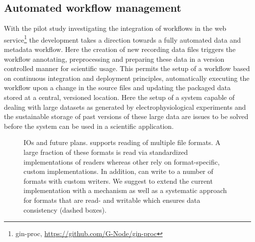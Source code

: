 \subsection{Automated workflow management}
With the pilot study investigating the integration of  workflows in the  web service\footnote{gin-proc, \url{https://github.com/G-Node/gin-proc}} the development takes a direction towards a fully automated data and metadata workflow. Here the creation of new recording data files triggers the workflow annotating, preprocessing and preparing these data in a version controlled manner for scientific usage. This permits the setup of a workflow based on continuous integration and deployment principles, automatically executing the workflow upon a change in the source files and updating the packaged data stored at a central, versioned location. Here the setup of a system capable of dealing with large datasets as generated by electrophysiological experiments and the sustainable storage of past versions of these large data are issues to be solved before the system can be used in a scientific application.

\begin{figure}
 
 \caption[ IOs and future plans]{ IOs and future plans.  supports reading of multiple file formats. A large fraction of these formats is read via standardized implementations of readers whereas other rely on format-specific, custom implementations. In addition,  can write to a number of formats with custom writers. We suggest to extend the current implementation with a  mechanism as well as a systematic  approach for formats that are read- and writable which ensures data consistency (dashed boxes).}
 \label{fig:disc_neo_plans}
\end{figure}

